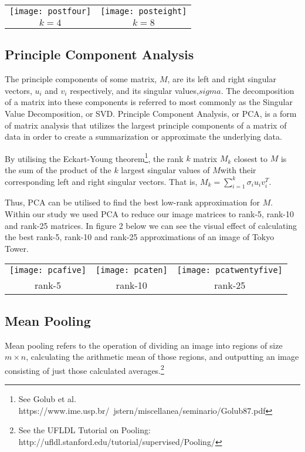 \documentclass[letterpaper, 10 pt, conference]{ieeeconf}  %
\begin{document}
\vspace*{3mm}
\begin{tabular}{c c}
	\texttt{[image: postfour]} &
		\texttt{[image: posteight]} \\
	$k=4$ & $k=8$ \\
\end{tabular}

\subsection{Principle Component Analysis}
The principle components of some matrix, $M$, are its left and right singular vectors, $u_i$ and $v_i$ respectively, and its singular values,$sigma$. The decomposition of a matrix into these components is referred to most commonly as the Singular Value Decomposition, or SVD.
Principle Component Analysis, or PCA, is a form of matrix analysis that utilizes the largest principle components of a matrix of data in order to create a summarization or approximate the underlying data.

By utilising the Eckart-Young theorem\footnote{See Golub et al. https://www.ime.usp.br/~jstern/miscellanea/seminario/Golub87.pdf}, the rank $k$ matrix $M_k$ closest to $M$ is the sum of the product of the $k$ largest singular values of $M$with their corresponding left and right singular vectors. That is, $M_k = \sum_{i=1}^k \sigma_i u_i v_i^T$.

Thus, PCA can be utilised to find the best low-rank approximation for $M$.
Within our study we used PCA to reduce our image matrices to rank-5, rank-10 and rank-25 matrices.
In figure 2 below we can see the visual effect of calculating the best rank-5, rank-10 and rank-25
approximations of an image of Tokyo Tower.

\vspace*{3mm}
\begin{tabular}{c c c}
	\texttt{[image: pcafive]} &
		\texttt{[image: pcaten]} &
		\texttt{[image: pcatwentyfive]} \\
	rank-5 & rank-10 & rank-25 \\
\end{tabular}

\subsection{Mean Pooling}
Mean pooling refers to the operation of dividing
an image into regions of size $m \times n$, calculating
the arithmetic mean of those regions, and outputting
an image consisting of just those calculated averages.\footnote{See the UFLDL Tutorial on Pooling: http://ufldl.stanford.edu/tutorial/supervised/Pooling/}
\end{document}
